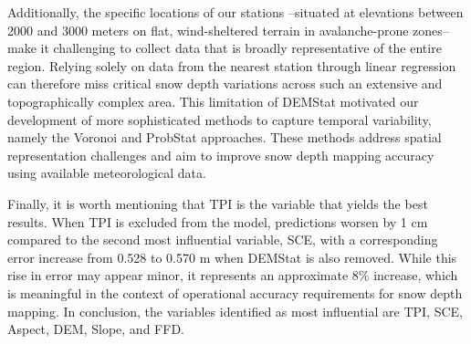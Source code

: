 \documentclass[preprint,12pt]{elsarticle}
\begin{document}
Additionally, the specific locations of our stations --situated at elevations between 2000 and 3000 meters on flat, wind-sheltered terrain in avalanche-prone zones-- make it challenging to collect data that is broadly representative of the entire region. Relying solely on data from the nearest station through linear regression can therefore miss critical snow depth variations across such an extensive and topographically complex area. This limitation of DEMStat motivated our development of more sophisticated methods to capture temporal variability, namely the Voronoi and ProbStat approaches. These methods address spatial representation challenges and aim to improve snow depth mapping accuracy using available meteorological data.

Finally, it is worth mentioning that TPI is the variable that yields the best results. When TPI is excluded from the model, predictions worsen by 1 cm compared to the second most influential variable, SCE, with a corresponding error increase from 0.528 to 0.570 m when DEMStat is also removed. While this rise in error may appear minor, it represents an approximate 8\% increase, which is meaningful in the context of operational accuracy requirements for snow depth mapping. In conclusion, the variables identified as most influential are TPI, SCE, Aspect, DEM, Slope, and FFD.

\end{document}

